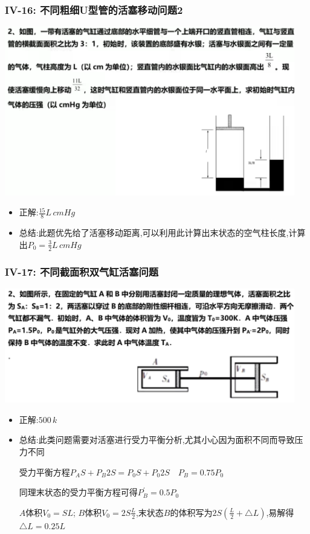 \documentclass{article}
\begin{document}
\vspace{2em}

\subsubsection{IV-16: 不同粗细U型管的活塞移动问题2}
\includegraphics[width = 0.95\textwidth,keepaspectratio]{./pictures/2.3-28.png}

\begin{itemize}
    \item 正解:\quad $\frac{15}{8} L \, cmHg$
    \item 总结:\quad 此题优先给了活塞移动距离,可以利用此计算出末状态的空气柱长度,计算出$P_{0} = \frac{3}{2} L \, cmHg$
\end{itemize}

\vspace{2em}

\subsubsection{IV-17: 不同截面积双气缸活塞问题}
\includegraphics[width = 0.95\textwidth,keepaspectratio]{./pictures/2.3-29.png}

\begin{itemize}
    \item 正解:\quad $ 500 \, k $
    \item 总结:\quad 此类问题需要对活塞进行受力平衡分析,尤其小心因为面积不同而导致压力不同
    
    \hspace{3.2em}受力平衡方程$ P_{A}S + P_{B}2S = P_{0}S + P_{0}2S \quad P_{B} = 0.75 P_{0}$

    \hspace{3.2em}同理末状态的受力平衡方程可得$P_{B}^{'} = 0.5 P_{0}$

    \hspace{3.2em}$A$体积$V_{0} = S L$; $B$体积$V_{0} = 2S \frac{L}{2}$,末状态$B$的体积写为$2S(\frac{L}{2} + \triangle L)$,易解得$\triangle L = 0.25L$
\end{itemize}
\end{document}
